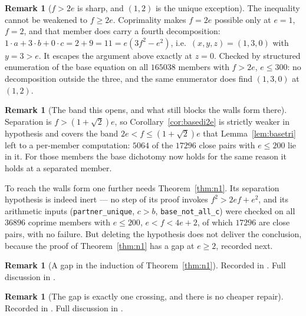 \documentclass[11pt,reqno]{amsart}
\theoremstyle{plain}
\theoremstyle{definition}
\newtheorem{remark}[theorem]{Remark}
\begin{document}
\begin{remark}[$f>2e$ is sharp, and $(1,2)$ is the unique exception]\label{rem:f2esharp}
The inequality cannot be weakened to $f\ge2e$. Coprimality makes $f=2e$ possible only at $e=1$,
$f=2$, and that member does carry a fourth decomposition: $1\cdot a+3\cdot b+0\cdot c=2+9=11=e(3f^2-e^2)$,
i.e.\ $(x,y,z)=(1,3,0)$ with $y=3>e$. It escapes the argument above exactly at $z=0$. Checked by
structured enumeration of the base equation on all $165038$ members with $f>2e$, $e\le300$: no
decomposition outside the three, and the same enumerator does find $(1,3,0)$ at $(1,2)$.
\end{remark}

\begin{remark}[The band this opens, and what still blocks the walls form there]\label{rem:band2e}
Separation is $f>(1+\sqrt2)e$, so Corollary~\ref{cor:basedi2e} is strictly weaker in hypothesis and
covers the band $2e<f\le(1+\sqrt2)e$ that Lemma~\ref{lem:basetri} left to a per-member
computation: $5064$ of the $17296$ close pairs with $e\le200$ lie in it. For those members the base
dichotomy now holds for the same reason it holds at a separated member.

To reach the walls form one further needs Theorem~\ref{thm:n1}. Its separation hypothesis is indeed
inert --- no step of its proof invokes $f^2>2ef+e^2$, and its arithmetic inputs
(\texttt{partner\_unique}, $c>b$, \texttt{base\_not\_all\_c}) were checked on all $36896$ coprime
members with $e\le200$, $e<f<4e+2$, of which $17296$ are close pairs, with no failure. But deleting
the hypothesis does not deliver the conclusion, because the proof of Theorem~\ref{thm:n1} has a gap
at $e\ge2$, recorded next.
\end{remark}

\begin{remark}[A gap in the induction of Theorem~\ref{thm:n1}]\label{rem:n1gap}
Recorded in \cite{Obstructions}. Full discussion in \cite{Obstructions}.
\end{remark}

\begin{remark}[The gap is exactly one crossing, and there is no cheaper repair]\label{rem:n1gapexact}
Recorded in \cite{Obstructions}. Full discussion in \cite{Obstructions}.
\end{remark}
\end{document}
